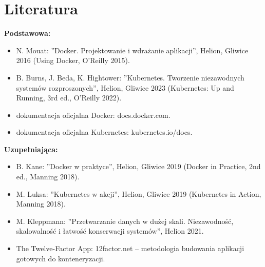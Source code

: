 \documentclass[12pt, a4paper]{article}
\begin{document}
\section{Literatura}

\textbf{Podstawowa:}
\begin{itemize}
  \item N. Mouat: ''Docker. Projektowanie i wdrażanie aplikacji'', Helion, Gliwice 2016 (Using Docker, O'Reilly 2015).
  \item B. Burns, J. Beda, K. Hightower: ''Kubernetes. Tworzenie niezawodnych systemów rozproszonych'', Helion, Gliwice 2023 (Kubernetes: Up and Running, 3rd ed., O'Reilly 2022).
  \item dokumentacja oficjalna Docker: docs.docker.com.
  \item dokumentacja oficjalna Kubernetes: kubernetes.io/docs.
\end{itemize}

\textbf{Uzupełniająca:}
\begin{itemize}
  \item B. Kane: ''Docker w praktyce'', Helion, Gliwice 2019 (Docker in Practice, 2nd ed., Manning 2018).
  \item M. Luksa: ''Kubernetes w akcji'', Helion, Gliwice 2019 (Kubernetes in Action, Manning 2018).
  \item M. Kleppmann: ''Przetwarzanie danych w dużej skali. Niezawodność, skalowalność i łatwość konserwacji systemów'', Helion 2021.
  \item The Twelve-Factor App: 12factor.net – metodologia budowania aplikacji gotowych do konteneryzacji.
\end{itemize}
\end{document}
